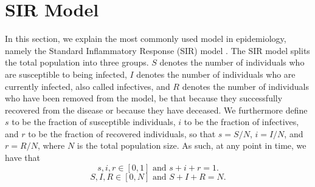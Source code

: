 \documentclass[12pt]{article}
\begin{document}
	
	
	
	\section{SIR Model}\label{sec:sir_model}
	In this section, we explain the most commonly used model in epidemiology, namely the Standard Inflammatory Response (SIR) model \parencite{kermack1927contribution, anderson1992infectious}. The SIR model splits the total population into three groups. $S$ denotes the number of individuals who are susceptible to being infected, $I$ denotes the number of individuals who are currently infected, also called infectives, and $R$ denotes the number of individuals who have been removed from the model, be that because they successfully recovered from the disease or because they have deceased. We furthermore define $s$ to be the fraction of susceptible individuals, $i$ to be the fraction of infectives, and $r$ to be the fraction of recovered individuals, so that $s = S/N$, $i = I/N$, and $r = R/N$, where $N$ is the total population size. As such, at any point in time, we have that
	    \[s,i,r \in [0,1] \text{ and } s+i+r=1.\]
	    \[S,I,R \in [0,N] \text{ and } S+I+R=N.\]
	
\end{document}
